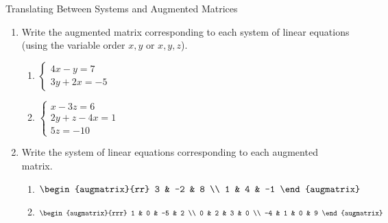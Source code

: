 \documentclass{article}
\begin{document}
\begin{activity} Translating Between Systems and Augmented Matrices
\begin{enumerate}
  \item Write the augmented matrix corresponding to each system of linear equations (using the variable order \(x, y\) or \(x, y, z\)).
  \begin{enumerate}
    \item \(\begin{cases} 4x - y = 7 \\ 3y + 2x = -5 \end{cases}\)
    \item \(\begin{cases} x - 3z = 6 \\ 2y + z - 4x = 1 \\ 5z = -10 \end{cases}\)
  \end{enumerate}

  \item Write the system of linear equations corresponding to each augmented matrix.
  \begin{enumerate}
    \item \(\begin{augmatrix}{rr}
      3 & -2 & 8 \\
      1 & 4 & -1
    \end{augmatrix}\)
    \item \(\begin{augmatrix}{rrr}
      1 & 0 & -5 & 2 \\
      0 & 2 & 3 & 0 \\
      -4 & 1 & 0 & 9
    \end{augmatrix}\)
  \end{enumerate}
\end{enumerate}
\end{activity}
\end{document}
